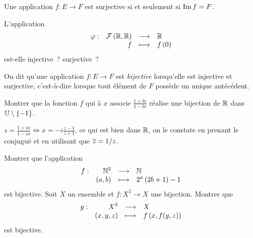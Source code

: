 \documentclass{magnolia}
\begin{document}
\begin{proposition}[utile=-3]
Une application $f:E\to F$ est surjective si et seulement si $\operatorname{Im} f=F$.
\end{proposition}

\begin{exos}
\exo L'application
  \[\begin{array}[t]{lrcl} \displaystyle{\varphi} : & \displaystyle{\mathcal{F}\left(\mathbb{R},\mathbb{R}\right)} & \longrightarrow & \displaystyle{\mathbb{R}} \\ & \displaystyle{f} & \longmapsto & \displaystyle{f\left(0\right)} \end{array}\]
  est-elle injective~? surjective~?
\end{exos}

\begin{definition}[utile=-3]
On dit qu'une application $f:E\to F$ est \emph{bijective} lorsqu'elle est injective et
surjective, c'est-à-dire lorsque tout élément de $F$ possède un unique antécédent.
\end{definition}

\begin{exos}
\exo Montrer que la fonction $f$ qui à $x$ associe $\frac{1+\ii x}{1-\ii x}$
  réalise une bijection de $\mathbb{R}$ dans $\U\setminus\ens{-1}$.
  \begin{sol}
  $\displaystyle z=\frac{1+ix}{1-ix}\Longleftrightarrow x=-i \frac{z-1}{z+1}$, ce qui est bien dans $\mathbb{R}$, on le constate en prenant le conjugué et en utilisant que $\overline{z}=1/z$.
  \end{sol}
\exo Montrer que l'application
  \[\begin{array}[t]{lrcl} \displaystyle{f} : & \displaystyle{\mathbb{N}^2} & \longrightarrow & \displaystyle{\mathbb{N}} \\ & \displaystyle{\left(a,b\right)} & \longmapsto & \displaystyle{2^a\left(2b+1\right)-1} \end{array}\]
  est bijective.
\exo Soit $X$ un ensemble et $f:X^2\to X$ une bijection. Montrer que
  \[\begin{array}[t]{lrcl} \displaystyle{g} : & \displaystyle{X^3} & \longrightarrow & \displaystyle{X} \\ & \displaystyle{(x,y,z)} & \longmapsto & \displaystyle{f\left(x,f(y,z)\right)} \end{array}\]
  est bijective.
\end{exos}


\end{document}
